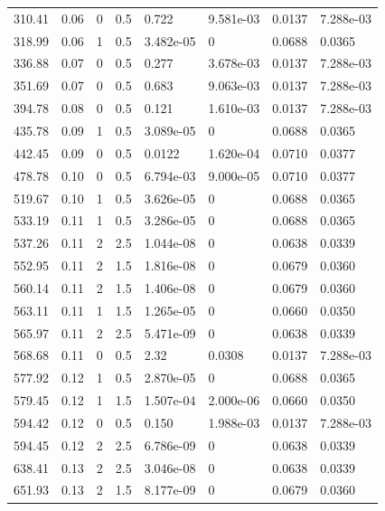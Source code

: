 \documentclass[preview]{standalone}
\begin{document}
{{\begin{tabular}{L{1.2cm}C{1.2cm} C{0.3cm}C{0.5cm} C{1.4cm}C{1.4cm} C{1.4cm}C{1.4cm}}
  310.41  &  0.06  & 0     & 0.5 &  0.722  & 9.581e-03  & 0.0137 &  7.288e-03   \\ 
  318.99  &  0.06  & 1     & 0.5 &  3.482e-05  & 0  & 0.0688 &  0.0365   \\ 
  336.88  &  0.07  & 0     & 0.5 &  0.277  & 3.678e-03  & 0.0137 &  7.288e-03   \\ 
  351.69  &  0.07  & 0     & 0.5 &  0.683  & 9.063e-03  & 0.0137 &  7.288e-03   \\ 
  394.78  &  0.08  & 0     & 0.5 &  0.121  & 1.610e-03  & 0.0137 &  7.288e-03   \\ 
  435.78  &  0.09  & 1     & 0.5 &  3.089e-05  & 0  & 0.0688 &  0.0365   \\ 
  442.45  &  0.09  & 0     & 0.5 &  0.0122  & 1.620e-04  & 0.0710 &  0.0377   \\ 
  478.78  &  0.10  & 0     & 0.5 &  6.794e-03  & 9.000e-05  & 0.0710 &  0.0377   \\ 
  519.67  &  0.10  & 1     & 0.5 &  3.626e-05  & 0  & 0.0688 &  0.0365   \\ 
  533.19  &  0.11  & 1     & 0.5 &  3.286e-05  & 0  & 0.0688 &  0.0365   \\ 
  537.26  &  0.11  & 2     & 2.5 &  1.044e-08  & 0  & 0.0638 &  0.0339   \\ 
  552.95  &  0.11  & 2     & 1.5 &  1.816e-08  & 0  & 0.0679 &  0.0360   \\ 
  560.14  &  0.11  & 2     & 1.5 &  1.406e-08  & 0  & 0.0679 &  0.0360   \\ 
  563.11  &  0.11  & 1     & 1.5 &  1.265e-05  & 0  & 0.0660 &  0.0350   \\ 
  565.97  &  0.11  & 2     & 2.5 &  5.471e-09  & 0  & 0.0638 &  0.0339   \\ 
  568.68  &  0.11  & 0     & 0.5 &  2.32  & 0.0308  & 0.0137 &  7.288e-03   \\ 
  577.92  &  0.12  & 1     & 0.5 &  2.870e-05  & 0  & 0.0688 &  0.0365   \\ 
  579.45  &  0.12  & 1     & 1.5 &  1.507e-04  & 2.000e-06  & 0.0660 &  0.0350   \\ 
  594.42  &  0.12  & 0     & 0.5 &  0.150  & 1.988e-03  & 0.0137 &  7.288e-03   \\ 
  594.45  &  0.12  & 2     & 2.5 &  6.786e-09  & 0  & 0.0638 &  0.0339   \\ 
  638.41  &  0.13  & 2     & 2.5 &  3.046e-08  & 0  & 0.0638 &  0.0339   \\ 
  651.93  &  0.13  & 2     & 1.5 &  8.177e-09  & 0  & 0.0679 &  0.0360   \\ 

\end{tabular}}}
\end{document}
